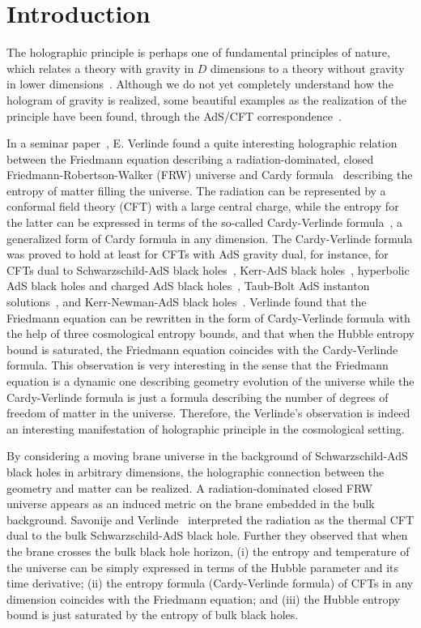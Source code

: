 \documentclass[a4paper,12pt]{article}
\newcommand{\sect}[1]{\setcounter{equation}{0}\section{#1}}
\begin{document}
\sect{Introduction}

The holographic principle is perhaps one of fundamental principles
of nature, which relates a theory with gravity in $D$ dimensions
to a theory without gravity in lower dimensions~\cite{Hooft}.
Although we do not yet completely understand how the hologram of
gravity is realized, some beautiful examples as the realization of
the principle have been found, through the AdS/CFT
correspondence~\cite{AdS}.


In a seminar paper~\cite{Verl},  E. Verlinde found a quite
interesting holographic relation between the Friedmann equation
describing  a radiation-dominated, closed
Friedmann-Robertson-Walker (FRW) universe and Cardy
formula~\cite{Cardy} describing the entropy of matter filling the
universe. The radiation can be represented by a conformal field
theory (CFT) with a large central charge, while the entropy for the
latter can be expressed in terms of the so-called Cardy-Verlinde
formula~\cite{Verl}, a generalized form of Cardy formula in any
dimension. The Cardy-Verlinde formula was proved to hold at least
for CFTs with AdS gravity dual, for instance, for CFTs dual to
Schwarzschild-AdS black holes~\cite{Verl}, Kerr-AdS black
holes~\cite{Klemm}, hyperbolic AdS black holes and charged AdS
black holes~\cite{Cai1}, Taub-Bolt AdS instanton
solutions~\cite{Birm}, and Kerr-Newman-AdS black
holes~\cite{Jing}. Verlinde found that the Friedmann equation can
be rewritten in the form of Cardy-Verlinde formula with the help
of three cosmological entropy bounds, and that when the Hubble entropy
bound is saturated, the Friedmann equation coincides with the
Cardy-Verlinde formula.  This observation is very interesting in the 
sense that the Friedmann equation is a dynamic one describing geometry
evolution of the universe while the Cardy-Verlinde formula is just a formula
describing the number of degrees of freedom of matter in the universe.
Therefore, the Verlinde's observation is indeed an interesting 
manifestation of holographic principle in the cosmological setting.

By considering a moving brane universe in the background of
Schwarzschild-AdS black holes in arbitrary dimensions, the
holographic connection between the geometry and matter can be
realized. A radiation-dominated closed FRW universe appears as an induced
metric on the brane embedded in the bulk background. Savonije and 
Verlinde~\cite{SV} interpreted the radiation
as the thermal CFT dual to the bulk Schwarzschild-AdS black hole. 
Further they observed that when the
brane crosses the bulk black hole horizon, (i) the entropy and
temperature of the universe can be simply expressed in terms of
the Hubble parameter and its time derivative; (ii) the entropy
formula (Cardy-Verlinde formula) of CFTs in any dimension
coincides with the Friedmann equation; and (iii) the Hubble entropy
bound is just saturated by the entropy of bulk black holes.
\end{document}

